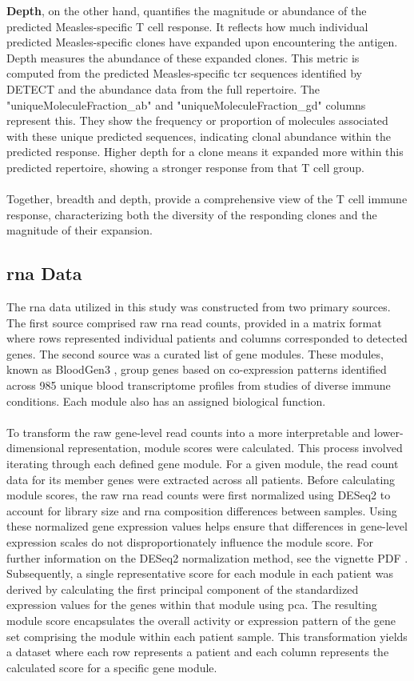\documentclass[12pt,a4paper]{report}
\begin{document}
\textbf{Depth}, on the other hand, quantifies the magnitude or abundance of the predicted Measles-specific T cell response. It reflects how much individual predicted Measles-specific clones have expanded upon encountering the antigen. Depth measures the abundance of these expanded clones. This metric is computed from the predicted Measles-specific \gls{tcr} sequences identified by DETECT and the abundance data from the full repertoire. The "uniqueMoleculeFraction\_ab" and "uniqueMoleculeFraction\_gd" columns represent this. They show the frequency or proportion of molecules associated with these unique predicted sequences, indicating clonal abundance within the predicted response. Higher depth for a clone means it expanded more within this predicted repertoire, showing a stronger response from that T cell group.\\
\\
Together, breadth and depth, provide a comprehensive view of the T cell immune response, characterizing both the diversity of the responding clones and the magnitude of their expansion.

\subsection{\acrshort{rna} Data}
The \acrshort{rna} data utilized in this study was constructed from two primary sources. The first source comprised raw \acrshort{rna} read counts, provided in a matrix format where rows represented individual patients and columns corresponded to detected genes. The second source was a curated list of gene modules. These modules, known as BloodGen3 \cite{Altman2021BloodGen3}, group genes based on co-expression patterns identified across 985 unique blood transcriptome profiles from studies of diverse immune conditions. Each module also has an assigned biological function.\\
\\
To transform the raw gene-level read counts into a more interpretable and lower-dimensional representation, module scores were calculated. This process involved iterating through each defined gene module. For a given module, the read count data for its member genes were extracted across all patients. Before calculating module scores, the raw \acrshort{rna} read counts were first normalized using DESeq2 to account for library size and \acrshort{rna} composition differences between samples. Using these normalized gene expression values helps ensure that differences in gene-level expression scales do not disproportionately influence the module score. For further information on the DESeq2 normalization method, see the vignette PDF \cite{DESeq2Manual2025}. Subsequently, a single representative score for each module in each patient was derived by calculating the first principal component of the standardized expression values for the genes within that module using \gls{pca}. The resulting module score encapsulates the overall activity or expression pattern of the gene set comprising the module within each patient sample. This transformation yields a dataset where each row represents a patient and each column represents the calculated score for a specific gene module.
\end{document}
